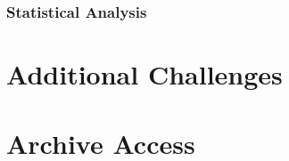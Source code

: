 \documentclass[
]{book}
\begin{document}
\hypertarget{statistical-analysis}{%
\subsection{Statistical Analysis}\label{statistical-analysis}}

\hypertarget{additional-challenges}{%
\chapter{Additional Challenges}\label{additional-challenges}}

\hypertarget{archive-access}{%
\chapter{Archive Access}\label{archive-access}}

  
\end{document}
